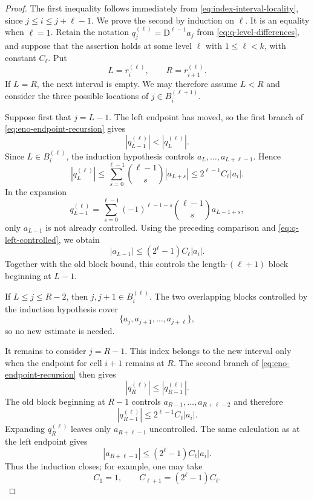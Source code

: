 \documentclass[11pt]{amsart}
\theoremstyle{plain}
\theoremstyle{definition}
\theoremstyle{remark}
\numberwithin{equation}{section}
\theoremstyle{plain}
\begin{document}
\begin{proof}
	The first inequality follows immediately from
	\eqref{eq:index-interval-locality}, since
	$j\le i\le j+\ell-1$.  We prove the second by induction on $\ell$.  It is an
	equality when $\ell=1$.  Retain the notation
	$q_j^{(\ell)}=\mathrm D^{\ell-1}a_j$ from
	\eqref{eq:q-level-differences}, and suppose that the assertion holds at some
	level $\ell$ with $1\le\ell<k$, with constant $C_\ell$.  Put
	\[
	L=r_i^{(\ell)},
	\qquad
	R=r_{i+1}^{(\ell)}.
	\]
	If $L=R$, the next interval is empty.  We may therefore assume $L<R$ and
	consider the three possible locations of $j\in B_i^{(\ell+1)}$.
	
	Suppose first that $j=L-1$.  The left endpoint has moved, so the first branch
	of \eqref{eq:eno-endpoint-recursion} gives
	\[
	|q_{L-1}^{(\ell)}|<|q_L^{(\ell)}|.
	\]
	Since $L\in B_i^{(\ell)}$, the induction hypothesis controls
	$a_L,\ldots,a_{L+\ell-1}$.  Hence
	\begin{equation}\label{eq:q-left-controlled}
		|q_L^{(\ell)}|
		\le \sum_{s=0}^{\ell-1}\binom{\ell-1}{s}|a_{L+s}|
		\le 2^{\ell-1}C_\ell|a_i|.
	\end{equation}
	In the expansion
	\[
	q_{L-1}^{(\ell)}
	=\sum_{s=0}^{\ell-1}
	(-1)^{\ell-1-s}\binom{\ell-1}{s}a_{L-1+s},
	\]
	only $a_{L-1}$ is not already controlled.  Using the preceding comparison and
	\eqref{eq:q-left-controlled}, we obtain
	\begin{equation}\label{eq:new-left-amplitude}
		|a_{L-1}|
		\le (2^\ell-1)C_\ell|a_i|.
	\end{equation}
	Together with the old block bound, this controls the length-$(\ell+1)$ block
	beginning at $L-1$.
	
	If $L\le j\le R-2$, then $j,j+1\in B_i^{(\ell)}$.  The two overlapping
	blocks controlled by the induction hypothesis cover
	\[
	\{a_j,a_{j+1},\ldots,a_{j+\ell}\},
	\]
	so no new estimate is needed.
	
	It remains to consider $j=R-1$.  This index belongs to the new interval only
	when the endpoint for cell $i+1$ remains at $R$.  The second branch of
	\eqref{eq:eno-endpoint-recursion} then gives
	\[
	|q_R^{(\ell)}|\le|q_{R-1}^{(\ell)}|.
	\]
	The old block beginning at $R-1$ controls
	$a_{R-1},\ldots,a_{R+\ell-2}$ and therefore
	\[
	|q_{R-1}^{(\ell)}|
	\le 2^{\ell-1}C_\ell|a_i|.
	\]
	Expanding $q_R^{(\ell)}$ leaves only $a_{R+\ell-1}$ uncontrolled.  The same
	calculation as at the left endpoint gives
	\begin{equation}\label{eq:new-right-amplitude}
		|a_{R+\ell-1}|
		\le(2^\ell-1)C_\ell|a_i|.
	\end{equation}
	Thus the induction closes; for example, one may take
	\[
	C_1=1,
	\qquad
	C_{\ell+1}=(2^\ell-1)C_\ell.
	\]
\end{proof}
\end{document}
